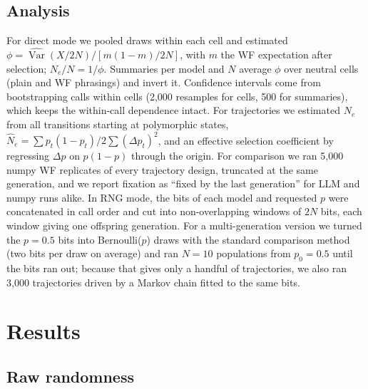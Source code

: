 \documentclass[11pt,a4paper]{article}
\newcommand{\Ne}{N_e}
\newcommand{\Var}{\operatorname{Var}}
\begin{document}
\subsection{Analysis}
For direct mode we pooled draws within each cell and estimated $\phi=\widehat{\Var}(X/2N)\big/[m(1-m)/2N]$, with $m$ the WF expectation after selection; $\Ne/N=1/\phi$.
Summaries per model and $N$ average $\phi$ over neutral cells (plain and WF phrasings) and invert it.
Confidence intervals come from bootstrapping calls within cells (2,000 resamples for cells, 500 for summaries), which keeps the within-call dependence intact.
For trajectories we estimated $\Ne$ from all transitions starting at polymorphic states, $\hat\Ne=\sum p_t(1-p_t)\big/2\sum(\Delta p_t)^2$, and an effective selection coefficient by regressing $\Delta p$ on $p(1-p)$ through the origin.
For comparison we ran 5,000 numpy WF replicates of every trajectory design, truncated at the same generation, and we report fixation as ``fixed by the last generation'' for LLM and numpy runs alike.
In RNG mode, the bits of each model and requested $p$ were concatenated in call order and cut into non-overlapping windows of $2N$ bits, each window giving one offspring generation.
For a multi-generation version we turned the $p=0.5$ bits into Bernoulli($p$) draws with the standard comparison method (two bits per draw on average) and ran $N=10$ populations from $p_0=0.5$ until the bits ran out; because that gives only a handful of trajectories, we also ran 3,000 trajectories driven by a Markov chain fitted to the same bits.

\section{Results}

\subsection{Raw randomness}

\begin{table}[t]
\centering\small
\caption{Bit sequences requested with $p=0.5$ (pooled phrasings, 40 calls and about 12,000 bits per model), and the slope of the logit shrinkage curve fitted across $p\in\{0.05,0.2,0.5,0.8\}$. The iid row gives the expectation for independent fair bits; the longest run is the median over simulated 300-bit sequences.}
\label{tab:bits}
\resizebox{\textwidth}{!}{}
\end{table}
\end{document}
